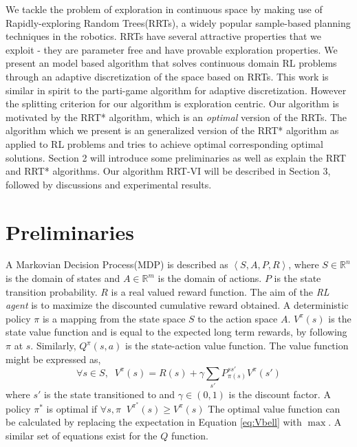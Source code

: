 \documentclass{article} %
\begin{document}
 We tackle the problem of exploration in continuous space by making use of Rapidly-exploring Random Trees(RRTs), a widely popular sample-based planning techniques in the robotics\cite{rrt}. RRTs have several attractive properties that we exploit - they are parameter free and have provable exploration properties. We present an model based algorithm that solves continuous domain RL problems through an adaptive discretization of the space based on RRTs. This work is similar in spirit to the parti-game algorithm for adaptive discretization\cite{partigame}. However the splitting criterion for our algorithm is exploration centric. Our algorithm is motivated by the RRT*\cite{rrtstar} algorithm, which is an \emph{optimal} version of the RRTs. The algorithm which we present is an generalized version of the RRT* algorithm as applied to RL problems and tries to achieve optimal corresponding optimal solutions. Section 2 will introduce some preliminaries as well as explain the RRT and RRT* algorithms. Our algorithm RRT-VI will be described in Section 3, followed by discussions and experimental results.


\section{Preliminaries}
\label{sec:prelims}
A Markovian Decision Process(MDP) is described as $\left\langle S,A,P,R\right\rangle$, where $S\in \mathbb{R}^n$ is the domain of states and $A\in \mathbb{R}^m$ is the domain of actions. $P$ is the state transition probability. $R$ is a real valued reward function. The aim of the \textit{RL agent} is to maximize the discounted cumulative reward obtained.
A deterministic policy $\pi$ is a mapping from the state space $S$ to the action space $A$. $V^\pi(s)$ is the state value function and is equal to the expected long term rewards, by following $\pi$ at $s$. Similarly, $Q^\pi(s,a)$ is the state-action value function. The value function might be expressed as,
\begin{equation}
\label{eq:Vbell}
\forall s \in S,\;\; V^\pi(s) = R(s) + \gamma \sum_{s'}P^{ss'}_{\pi(s)}V^\pi(s')
\end{equation}
where $s'$ is the state transitioned to and $\gamma \in \left(0,1\right)$ is the discount factor. A policy $\pi^*$ is optimal if $ \forall s,\pi\;\; V^{\pi^*}(s)\geq V^\pi(s) $ The optimal value function can be calculated by replacing the expectation in Equation \ref{eq:Vbell} with $\max$. A similar set of equations exist for the $Q$ function.
\end{document}
